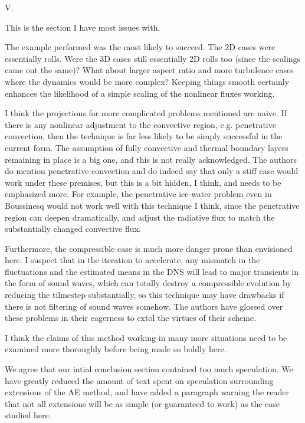 \documentclass[aps, 11pt, singlecolumn]{revtex4-1} %
\begin{document}
\begin{singlespace}
\begin{myquotation}
V.

This is the section I have most issues with.

The example performed was the most likely to succeed. The 2D cases
were essentially rolls. Were the 3D cases still essentially 2D rolls
too (since the scalings came out the same)? What about larger aspect
ratio and more turbulence cases where the dynamics would be more
complex? Keeping things smooth certainly enhances the likelihood of a
simple scaling of the nonlinear fluxes working.

I think the projections for more complicated problems mentioned are
naive. If there is any nonlinear adjustment to the convective region,
e.g. penetrative convection, then the technique is far less likely to
be simply successful in the current form. The assumption of fully
convective and thermal boundary layers remaining in place is a big
one, and this is not really acknowledged. The authors do mention
penetrative convection and do indeed say that only a stiff case would
work under these premises, but this is a bit hidden, I think, and
needs to be emphasized more. For example, the penetrative ice-water
problem even in Boussinesq would not work well with this technique I
think, since the penetrative region can deepen dramatically, and
adjust the radiative flux to match the substantially changed
convective flux.

Furthermore, the compressible case is much more danger prone than
envisioned here. I suspect that in the iteration to accelerate, any
mismatch in the fluctuations and the estimated means in the DNS will
lead to major transients in the form of sound waves, which can totally
destroy a compressible evolution by reducing the tilmestep
substantially, so this technique may have drawbacks if there is not
filtering of sound waves somehow. The authors have glossed over these
problems in their eagerness to extol the virtues of their scheme.

I think the claims of this method working in many more situations need
to be examined more thoroughly before being made so boldly here.
\end{myquotation}
We agree that our intial conclusion section contained too much speculation.
We have 
greatly reduced the amount of text spent on speculation surrounding
extensions of the AE method, and have added a paragraph warning the
reader that not all extensions will be as simple (or guaranteed to work)
as the case studied here.


\end{singlespace}
\end{document}
